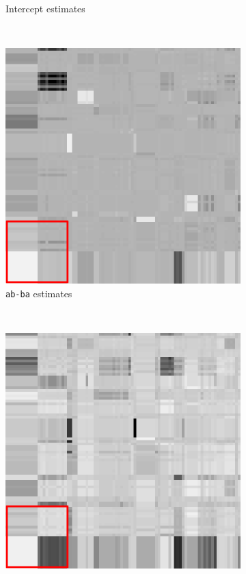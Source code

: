 \documentclass{article}
\begin{document}
\begin{figure}[t]
\begin{subfigure}[b]{0.22\textwidth}
\caption{Intercept estimates}
\end{subfigure}
~
\begin{subfigure}[b]{0.22\textwidth}
\centering
\includegraphics[scale=.25]{../figs/eckmann-small/parmat/2}
\caption{\texttt{ab-ba} estimates}
\end{subfigure}
~
\begin{subfigure}[b]{0.22\textwidth}
\centering
\includegraphics[scale=.25]{../figs/eckmann-small/parmat/3}

\end{subfigure}
\end{figure}
\end{document}
